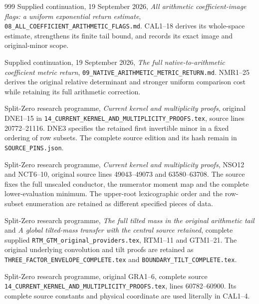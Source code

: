 \documentclass[11pt,a4paper]{article}
\begin{document}
\begin{thebibliography}{999}
Supplied continuation, 19 September 2026,
\emph{All arithmetic coefficient-image flags: a uniform exponential
return estimate}, \texttt{08\_ALL\_COEFFICIENT\_ARITHMETIC\_FLAGS.md}.
CAL1--18 derives its whole-space estimate, strengthens its finite
tail bound, and records its exact image and original-minor scope.

Supplied continuation, 19 September 2026,
\emph{The full native-to-arithmetic coefficient metric return},
\texttt{09\_NATIVE\_ARITHMETIC\_METRIC\_RETURN.md}.
NMR1--25 derives the original relative determinant and stronger
uniform comparison cost while retaining its full arithmetic correction.

Split-Zero research programme, \emph{Current kernel and multiplicity
proofs}, original DNE1--15 in
\texttt{14\_CURRENT\_KERNEL\_AND\_MULTIPLICITY\_PROOFS.tex},
source lines 20772--21116. DNE3 specifies the retained first
invertible minor in a fixed ordering of row subsets. The complete
source edition and its hash remain in \texttt{SOURCE\_PINS.json}.

Split-Zero research programme, \emph{Current kernel and multiplicity
proofs}, NSO12 and NCT6--10, original source lines 49043--49073
and 63580--63708. The source fixes the full unscaled conductor,
the numerator moment map and the complete lower-evaluation minimum.
The upper-root lexicographic order and the row-subset enumeration
are retained as different specified pieces of data.

Split-Zero research programme, \emph{The full tilted mass in the
original arithmetic tail} and \emph{A global tilted-mass transfer
with the central source retained}, complete supplied
\texttt{RTM\_GTM\_original\_providers.tex}, RTM1--11 and GTM1--21.
The original underlying convolution and tilt proofs are retained
as \texttt{THREE\_FACTOR\_ENVELOPE\_COMPLETE.tex} and
\texttt{BOUNDARY\_TILT\_COMPLETE.tex}.

Split-Zero research programme, original GRA1--6, complete source
\texttt{14\_CURRENT\_KERNEL\_AND\_MULTIPLICITY\_PROOFS.tex},
lines 60782--60900. Its complete source constants and physical
coordinate are used literally in CAL1--4.


\end{thebibliography}
\end{document}
